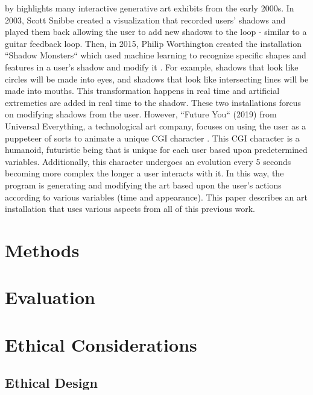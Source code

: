 \documentclass[10pt,twocolumn]{article}
\begin{document}
 by \citeauthor{kwon_real-time_nodate} highlights many interactive generative art exhibits from the early 2000s. In 2003, Scott Snibbe created a visualization that recorded users' shadows and played them back allowing the user to add new shadows to the loop - similar to a guitar feedback loop.  Then, in 2015, Philip Worthington created the installation ``Shadow Monsters`` which used machine learning to recognize specific shapes and features in a user's shadow and modify it \cite{houston_public_media_mfah_2015}.  For example, shadows that look like circles will be made into eyes, and shadows that look like intersecting lines will be made into mouths.  This transformation happens in real time and artificial extremeties are added in real time to the shadow. These two installations forcus on modifying shadows from the user. However, ``Future You`` (2019) from Universal Everything, a technological art company, focuses on using the user as a puppeteer of sorts to animate a unique CGI character \cite{noauthor_future_2019}. This CGI character is a humanoid, futuristic being that is unique for each user based upon predetermined variables. Additionally, this character undergoes an evolution every 5 seconds becoming more complex the longer a user interacts with it.  In this way, the program is generating and modifying the art based upon the user's actions according to various variables (time and appearance).  This paper describes an art installation that uses various aspects from all of this previous work. 


\section{Methods}

\section{Evaluation}

\section{Ethical Considerations}


\subsection{Ethical Design}\label{sec:design}
\end{document}

